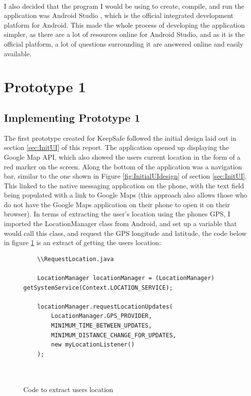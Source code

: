 \documentclass[a4paper]{report}
\begin{document}
\\I also decided that the program I would be using to create, compile, and run the application was Android Studio \cite{androidstudio}, which is the official integrated development platform for Android. This made the whole process of developing the application simpler, as there are a lot of resources online for Android Studio, and as it is the official platform, a lot of questions surrounding it are answered online and easily available. 
\section{Prototype 1} 
\label{sec:Prototype1}
\subsection{Implementing Prototype 1}
\label{sec:ImpPrototype1}
The first prototype created for KeepSafe followed the initial design laid out in section \ref{sec:InitUI} of this report. The application opened up displaying the Google Map API, which also showed the users current location in the form of a red marker on the screen. Along the bottom of the application was a navigation bar, similar to the one shown in Figure \ref{fig:InitialUIdesign} of section \ref{sec:InitUI}. This linked to the native messaging application on the phone, with the text field being populated with a link to Google Maps (this approach also allows those who do not have the Google Maps application on their phone to open it on their browser).
In terms of extracting the user's location using the phones GPS, I imported the LocationManager class from Android, and set up a variable that would call this class, and request the GPS longitude and latitude, the code below in figure \ref{fig:locationUpdate} is an extract of getting the users location: 
\begin{figure}[H]	
	\singlespacing
	\begin{lstlisting}
	\\RequestLocation.java
	
	LocationManager locationManager = (LocationManager) getSystemService(Context.LOCATION_SERVICE);
	
	locationManager.requestLocationUpdates(
		LocationManager.GPS_PROVIDER,
		MINIMUM_TIME_BETWEEN_UPDATES,
		MINIMUM_DISTANCE_CHANGE_FOR_UPDATES,
		new myLocationListener()
	);
	
	
	\end{lstlisting}
	\caption{Code to extract users location}
	\label{fig:locationUpdate}
\end{figure}
\end{document}
